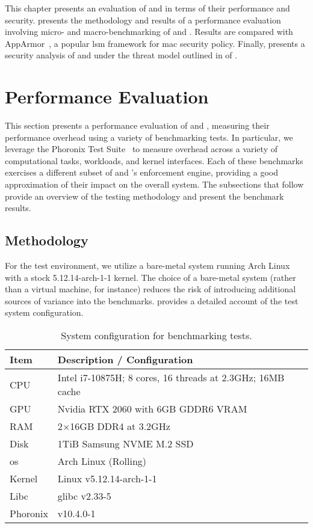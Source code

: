 This chapter presents an evaluation of \bpfbox{} and \bpfcontain{} in terms of their
performance and security.  presents the methodology and results
of a performance evaluation involving micro- and macro-benchmarking of \bpfbox{} and
\bpfcontain{}. Results are compared with AppArmor~\cite{cowan2000_apparmor}, a popular
\gls{lsm} framework for \gls{mac} security policy. Finally, 
presents a security analysis of \bpfbox{} and \bpfcontain{} under the threat model
outlined in  of .

\section{Performance Evaluation}%
\label{s:eval-performance}

This section presents a performance evaluation of \bpfbox{} and \bpfcontain{}, measuring
their performance overhead using a variety of benchmarking tests. In particular, we
leverage the Phoronix Test Suite~\cite{phoronix} to measure overhead across a variety of
computational tasks, workloads, and kernel interfaces. Each of these benchmarks exercises
a different subset of \bpfbox{} and \bpfcontain{}'s enforcement engine, providing a good
approximation of their impact on the overall system. The subsections that follow provide an
overview of the testing methodology and present the benchmark results.

\subsection{Methodology}%
\label{ss:eval-methodology}

For the test environment, we utilize a bare-metal system running Arch Linux with a stock
5.12.14-arch-1-1 kernel. The choice of a bare-metal system (rather than a virtual machine,
for instance) reduces the risk of introducing additional sources of variance into the
benchmarks.  provides a detailed account of the test system
configuration.

\begin{table}[htpb]
  \centering
  \caption[System configuration for benchmarking tests]{System configuration for benchmarking tests.}%
  \label{tab:system-config}
  \begin{tabular}{ll}
  \toprule
  Item & Description / Configuration \\
  \midrule
  CPU & Intel i7-10875H; 8 cores, 16 threads at 2.3GHz; 16MB cache\\
  GPU & Nvidia RTX 2060 with 6GB GDDR6 VRAM \\
  RAM & 2$\times$16GB DDR4 at 3.2GHz \\
  Disk & 1TiB Samsung NVME M.2 SSD \\
  \midrule
  \gls{os} & Arch Linux (Rolling) \\
  Kernel & Linux v5.12.14-arch-1-1 \\
  Libc & glibc v2.33-5 \\
  Phoronix & v10.4.0-1 \\
  \bottomrule
  \end{tabular}
\end{table}

